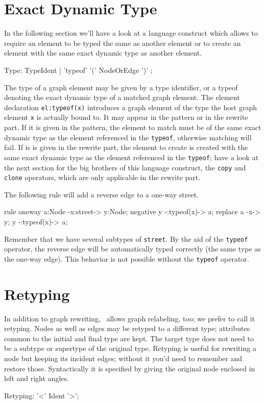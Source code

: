 \section{Exact Dynamic Type}\label{sec:typeof}

In the following section we'll have a look at a language construct which allows to require an element to be typed the same as another element or to create an element with the same exact dynamic type as another element.

\begin{rail}
  Type: TypeIdent | 'typeof' '(' NodeOrEdge ')' ;
\end{rail}
The type of a graph element may be given by a type identifier,
or a typeof denoting the exact dynamic type of a matched graph element.
The element declaration \texttt{el:typeof(x)} introduces a graph element of the type the host graph element \texttt{x} is actually bound to.
It may appear in the pattern or in the rewrite part.
If it is given in the pattern, the element to match must be of the same exact dynamic type as the element referenced in the \texttt{typeof}, otherwise matching will fail.
If is is given in the rewrite part, the element to create is created with the same exact dynamic type as the element referenced in the \texttt{typeof}; have a look at the next section for the big brothers of this language construct, the \texttt{copy} and \texttt{clone} operators, which are only applicable in the rewrite part.

\begin{example}
The following rule will add a reverse edge to a one-way street.
\begin{grgen}
rule oneway {
    a:Node -x:street-> y:Node;
    negative {
        y -:typeof(x)-> a;
    }
    replace {
        a -x-> y;
        y -:typeof(x)-> a;
    }
}
\end{grgen}
Remember that we have several subtypes of \texttt{street}. By the aid of the \texttt{typeof} operator, the reverse edge will be automatically typed correctly (the same type as the one-way edge). This behavior is not possible without the \texttt{typeof} operator.
\end{example}


\section{Retyping} \label{sec:retype}
In addition to graph rewriting, \GrG\ allows graph relabeling\cite{Relabelling}, too; we prefer to call it retyping.
Nodes as well as edges may be retyped to a different type; attributes common to the initial and final type are kept.
The target type does not need to be a subtype or supertype of the original type.
Retyping is useful for rewriting a node but keeping its incident edges; without it you'd need to remember and restore those.
Syntactically it is specified by giving the original node enclosed in left and right angles.
\begin{rail}
  Retyping: '<' Ident '>';
\end{rail}

